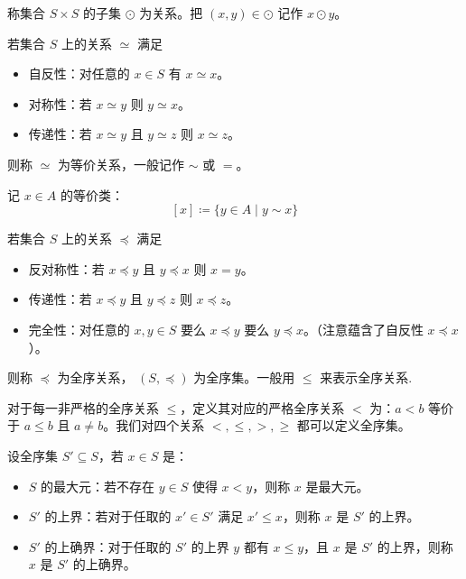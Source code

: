 称集合 $S\times S$ 的子集 $\odot$ 为关系。把 $(x,y) \in \odot$ 记作 $x \odot y$。

\begin{definition}[等价关系]
	若集合 $S$ 上的关系 $\simeq$ 满足

	\begin{itemize}
		\item 自反性：对任意的 $x\in S$ 有 $x \simeq x$。

		\item 对称性：若 $x \simeq y$ 则 $y \simeq x$。

		\item 传递性：若 $x \simeq y$ 且 $y \simeq z$ 则 $x \simeq z$。
	\end{itemize}

	则称 $\simeq$ 为等价关系，一般记作 $\sim$ 或 $=$。
\end{definition}

记 $x\in A$ 的等价类：
\[ [x] \coloneqq  \{y \in A \mid y \sim x\}\]

\begin{definition}[全序关系]
	若集合 $S$ 上的关系 $\preceq$ 满足

	\begin{itemize}
		\item 反对称性：若 $x \preceq y$ 且 $y \preceq x$ 则 $x = y$。

		\item 传递性：若 $x \preceq y$ 且 $y \preceq z$ 则 $x \preceq z$。

		\item 完全性：对任意的 $x,y\in S$ 要么 $x \preceq y$ 要么 $y \preceq x$。（注意蕴含了自反性 $x \preceq x$）。
	\end{itemize}
	则称 $\preceq$ 为全序关系， $(S,\preceq)$ 为全序集。一般用 $\leqslant$ 来表示全序关系.
\end{definition}

对于每一非严格的全序关系 $\leqslant$，定义其对应的严格全序关系 $<$ 为：$a < b$ 等价于 $a \leqslant b$ 且 $a \neq b$。我们对四个关系 $<, \leqslant, >, \geqslant$ 都可以定义全序集。

\begin{definition}
	设全序集 $S' \subseteq S$，若 $x \in S$ 是：

	\begin{itemize}
		\item $S$ 的最大元：若不存在 $y \in S$ 使得 $x < y$，则称 $x$ 是最大元。

		\item $S'$ 的上界：若对于任取的 $x' \in S'$ 满足 $x' \leqslant x$，则称 $x$ 是 $S'$ 的上界。

		\item $S'$ 的上确界：对于任取的 $S'$ 的上界 $y$ 都有 $x \leqslant y$，且 $x$ 是 $S'$ 的上界，则称 $x$ 是 $S'$ 的上确界。
	\end{itemize}
\end{definition}

